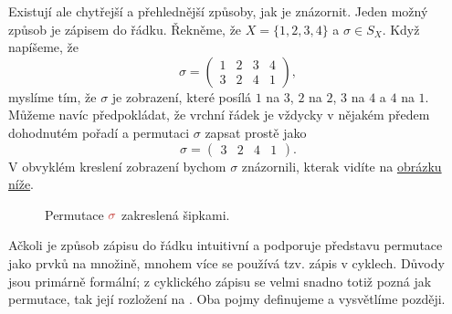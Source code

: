 Existují ale chytřejší a přehlednější způsoby, jak je znázornit. Jeden možný
způsob je zápisem do řádku. Řekněme, že $X = \{1,2,3,4\}$ a $\sigma \in S_X$.
Když napíšeme, že
\[
 \sigma = 
 \begin{pmatrix}
  1 & 2 & 3 & 4\\
  3 & 2 & 4 & 1
 \end{pmatrix},
\]
myslíme tím, že $\sigma$ je zobrazení, které posílá $1$ na $3$, $2$ na $2$, $3$
na $4$ a $4$ na $1$. Můžeme navíc předpokládat, že vrchní řádek je vždycky v
nějakém předem dohodnutém pořadí a permutaci $\sigma$ zapsat prostě jako
\[
 \sigma = \begin{pmatrix} 
 3 & 2 & 4 & 1
 \end{pmatrix}. 
\]
V obvyklém kreslení zobrazení bychom $\sigma$ znázornili, kterak vidíte na 
\hyperref[fig:permutace-jako-sipky]{obrázku níže}.
\begin{figure}[h]
 \centering
 \label{fig:permutace-jako-sipky}
 \caption{Permutace $\clr{\sigma}$ zakreslená šipkami.}
\end{figure}

Ačkoli je způsob zápisu do řádku intuitivní a podporuje představu permutace jako
 prvků na množině, mnohem více se používá tzv. zápis v cyklech.
Důvody jsou primárně formální; z cyklického zápisu se velmi snadno totiž pozná
jak  permutace, tak její rozložení na . Oba pojmy
definujeme a vysvětlíme později.

